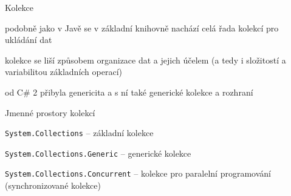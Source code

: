 




\begin{frame}[fragile]
\vfill
\begin{bitemize}{Kolekce}
\item podobně jako v Javě se v základní knihovně nachází celá řada kolekcí pro ukládání dat
\item kolekce se liší způsobem organizace dat a jejich účelem (a tedy i složitostí a variabilitou základních operací)
\item od C\# 2 přibyla genericita a s ní také generické kolekce a rozhraní
\end{bitemize}
\vfill
\begin{bitemize}{Jmenné prostory kolekcí}
\item \lstinline|System.Collections| -- základní kolekce
\item \lstinline|System.Collections.Generic| -- generické kolekce
\item \lstinline|System.Collections.Concurrent| -- kolekce pro paralelní programování (synchronizované kolekce)
\end{bitemize}
\vfill
\end{frame}


